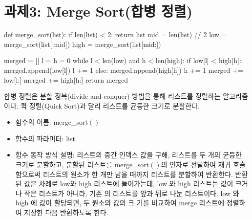 \documentclass{article}
\begin{document}
\section{과제3: Merge Sort(합병 정렬)}
\begin{python}
	def merge_sort(list):
		if len(list) < 2:
			return list
		mid = len(list) // 2
		low = merge_sort(list[:mid])
		high = merge_sort(list[mid:])

		merged = []
		l = h = 0
		while l < len(low) and h < len(high):
			if low[l] < high[h]:
				merged.append(low[l])
				l += 1
			else:
				merged.append(high[h])
				h += 1
		merged += low[l:]
		merged += high[h:]
		return merged
\end{python}
합병 정렬은 분할 정복(divide and conquer) 방법을 통해 리스트를 정렬하는 알고리즘이다.
퀵 정렬(Quick Sort)과 달리 리스트를 균등한 크기로 분할한다.
	\begin{itemize}
		\item 함수의 이름: merge\_sort$()$
		\item 함수의 파라미터: list
		\item 함수 동작 방식 설명: 리스트의 중간 인덱스 값을 구해, 리스트를 두 개의 균등한
		크기로 분할하고, 분할된 리스트를 merge\_sort$()$의 인자로 전달하여 재귀 호출함으로써
		리스트의 원소가 한 개만 남을 때까지 리스트를 분할하여 반환한다. 반환된 값은 차례로 low와
		high 리스트에 들어가는데, low 와 high 리스트는 값이 크거나 작은 리스트가 아니라, 기존
		의 리스트를 앞과 뒤로 나눈 리스트이다. low 와 high 에 값이 할당되면, 두 원소의 값의 크
		기를 비교하여 merge 리스트에 정렬하여 저장한 다음 반환하도록 한다.
	\end{itemize}
\end{document}

